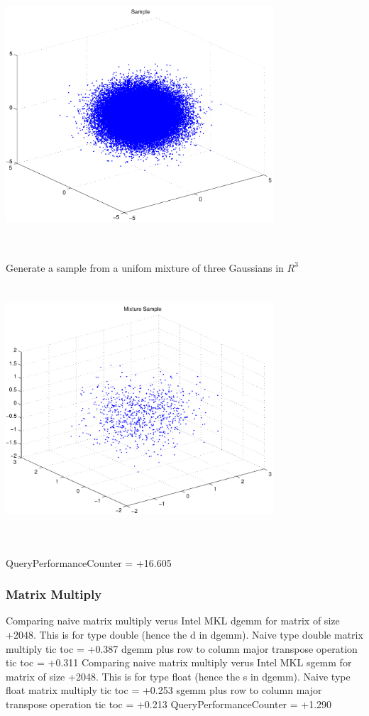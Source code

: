 \documentclass[9pt]{article}
\theoremstyle{plain}
\theoremstyle{definition}
\theoremstyle{remark}
\numberwithin{equation}{section}
\begin{document}
\includegraphics[width=10.0cm,height=10.0cm]{R_3_Normal.pdf}

Generate a sample from a unifom mixture of three Gaussians in $R^3$
\includegraphics[width=10.0cm,height=10.0cm]{R_3_Normal_Mixture.pdf}

QueryPerformanceCounter  =  +16.605
\subsubsection{Matrix Multiply}
Comparing naive matrix multiply verus Intel MKL dgemm for matrix of size +2048.
This is for type double (hence the d in dgemm).
Naive type double matrix multiply tic toc  =  +0.387
dgemm plus row to column major transpose operation tic toc  =  +0.311
Comparing naive matrix multiply verus Intel MKL sgemm for matrix of size +2048.
This is for type float (hence the s in dgemm).
Naive type float matrix multiply tic toc  =  +0.253
sgemm plus row to column major transpose operation tic toc  =  +0.213
QueryPerformanceCounter  =  +1.290
\end{document}

